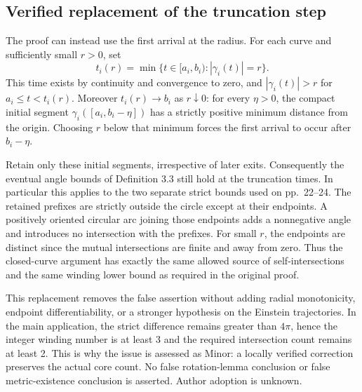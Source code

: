 \documentclass[10pt]{article}
\begin{document}
\subsection*{Verified replacement of the truncation step}
The proof can instead use the first arrival at the radius. For each curve and sufficiently small \(r>0\), set \[t_i(r)=\min\{t\in[a_i,b_i):|\gamma_i(t)|=r\}.\] This time exists by continuity and convergence to zero, and \(|\gamma_i(t)|>r\) for \(a_i\le t<t_i(r)\). Moreover \(t_i(r)\to b_i\) as \(r\downarrow0\): for every \(\eta>0\), the compact initial segment \(\gamma_i([a_i,b_i-\eta])\) has a strictly positive minimum distance from the origin. Choosing \(r\) below that minimum forces the first arrival to occur after \(b_i-\eta\).\par
Retain only these initial segments, irrespective of later exits. Consequently the eventual angle bounds of Definition 3.3 still hold at the truncation times. In particular this applies to the two separate strict bounds used on pp. 22–24. The retained prefixes are strictly outside the circle except at their endpoints. A positively oriented circular arc joining those endpoints adds a nonnegative angle and introduces no intersection with the prefixes. For small \(r\), the endpoints are distinct since the mutual intersections are finite and away from zero. Thus the closed-curve argument has exactly the same allowed source of self-intersections and the same winding lower bound as required in the original proof.\par
This replacement removes the false assertion without adding radial monotonicity, endpoint differentiability, or a stronger hypothesis on the Einstein trajectories. In the main application, the strict difference remains greater than \(4\pi\), hence the integer winding number is at least 3 and the required intersection count remains at least 2. This is why the issue is assessed as Minor: a locally verified correction preserves the actual core count. No false rotation-lemma conclusion or false metric-existence conclusion is asserted. Author adoption is unknown.\par
\end{document}
